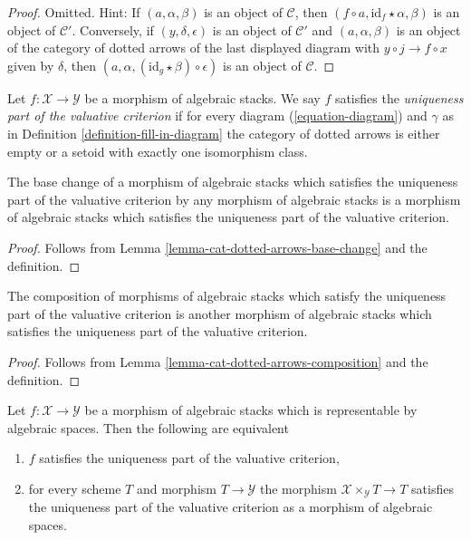 \begin{proof}
Omitted. Hint: If $(a, \alpha, \beta)$ is an object of $\mathcal{C}$,
then $(f \circ a, \text{id}_f \star \alpha, \beta)$ is an object
of $\mathcal{C}'$. Conversely, if $(y, \delta, \epsilon)$ is an
object of $\mathcal{C}'$ and $(a, \alpha, \beta)$ is an object
of the category of dotted arrows of the last displayed diagram
with $y \circ j \to f \circ x$ given by $\delta$, then
$(a, \alpha, (\text{id}_g \star \beta) \circ \epsilon)$ is an
object of $\mathcal{C}$.
\end{proof}

\begin{definition}
\label{definition-uniqueness}
Let $f : \mathcal{X} \to \mathcal{Y}$ be a morphism of algebraic stacks.
We say $f$ satisfies the {\it uniqueness part of the valuative criterion}
if for every diagram (\ref{equation-diagram}) and $\gamma$
as in Definition \ref{definition-fill-in-diagram}
the category of dotted arrows is either empty or
a setoid with exactly one isomorphism class.
\end{definition}

\begin{lemma}
\label{lemma-base-change-uniqueness}
The base change of a morphism of algebraic stacks which satisfies the
uniqueness part of the valuative criterion by any morphism of
algebraic stacks is a morphism of algebraic stacks which satisfies the
uniqueness part of the valuative criterion.
\end{lemma}

\begin{proof}
Follows from Lemma \ref{lemma-cat-dotted-arrows-base-change}
and the definition.
\end{proof}

\begin{lemma}
\label{lemma-composition-uniqueness}
The composition of morphisms of algebraic stacks which satisfy the
uniqueness part of the valuative criterion is another
morphism of algebraic stacks which satisfies the
uniqueness part of the valuative criterion.
\end{lemma}

\begin{proof}
Follows from Lemma \ref{lemma-cat-dotted-arrows-composition}
and the definition.
\end{proof}

\begin{lemma}
\label{lemma-uniqueness-representable}
Let $f : \mathcal{X} \to \mathcal{Y}$ be a morphism of algebraic stacks
which is representable by algebraic spaces. Then the following are equivalent
\begin{enumerate}
\item $f$ satisfies the uniqueness part of the valuative criterion,
\item for every scheme $T$ and morphism $T \to \mathcal{Y}$
the morphism $\mathcal{X} \times_\mathcal{Y} T \to T$ satisfies
the uniqueness part of the valuative criterion as a morphism
of algebraic spaces.
\end{enumerate}
\end{lemma}

